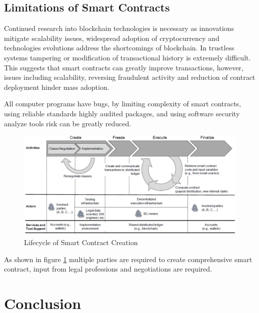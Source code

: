 \documentclass[12pt,tightenlines,letterpaper]{scrartcl}
\begin{document}
 
 
 

 \subsection{Limitations of Smart Contracts}
%
Continued research into \gls{blockchain} technologies is necessary as innovations mitigate scalability issues, widespread adoption of cryptocurrency and technologies evolutions address the shortcomings of blockchain. In trustless systems tampering or modification of transactional history is extremely difficult. This suggests that smart contracts can greatly improve transactions, however, issues including scalability, reversing fraudulent activity and reduction of contract deployment hinder mass adoption.

All computer programs have bugs, by limiting complexity of smart contracts,  using reliable standards highly audited packages, and using software security analyze tools risk can be greatly reduced. 
\begin{figure}[H]
\centering
\includegraphics[width=1\linewidth]{smartContractCreation}
\caption{Lifecycle of Smart Contract Creation \cite{Sillaber2017}}
\label{fig:smartcontractcreation}
\end{figure}

As shown in figure \ref{fig:smartcontractcreation} multiple parties are required to create comprehensive smart contract, input from legal professions and negotiations are required.



\newpage 
%
\section{Conclusion}
	
\end{document}
